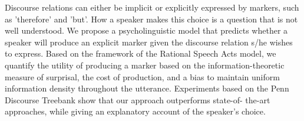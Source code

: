 Discourse relations can either be implicit or explicitly expressed by markers, such as 'therefore' and 'but'. How a speaker makes this choice is a question that is not well understood. We propose a psycholinguistic model that predicts whether a speaker will produce an explicit marker given the discourse relation s/he wishes to express. Based on the framework of the Rational Speech Acts model, we quantify the utility of producing a marker based on the information-theoretic measure of surprisal, the cost of production, and a bias to maintain uniform information density throughout the utterance. Experiments based on the Penn Discourse Treebank show that our approach outperforms state-of- the-art approaches, while giving an explanatory account of the speaker's choice.
